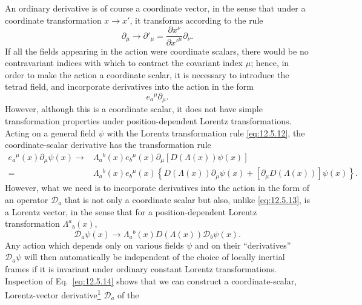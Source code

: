 An ordinary derivative is of course a coordinate vector, in the sense that
under a coordinate transformation \(x\longrightarrow x'\), it transforms
according to the rule
\[
  \partial_\mu
  \longrightarrow
  \partial'_\mu
  =
  \frac{\partial x^\nu}{\partial x'^\mu}\partial_\nu.
\]
If all the fields appearing in the action were coordinate scalars, there
would be no contravariant indices with which to contract the covariant index
\(\mu\); hence, in order to make the action a coordinate scalar, it is
necessary to introduce the tetrad field, and incorporate derivatives into the
action in the form
\begin{equation}
  e_a{}^\mu\partial_\mu.
  \tag{12.5.13}\label{eq:12.5.13}
\end{equation}
However, although this is a coordinate scalar, it does not have simple
transformation properties under position-dependent Lorentz transformations.
Acting on a general field \(\psi\) with the Lorentz transformation rule
\eqref{eq:12.5.12}, the coordinate-scalar derivative has the transformation
rule
\begin{equation}
\begin{aligned}
  e_a{}^\mu(x)\partial_\mu\psi(x)
  \longrightarrow{}&
  \Lambda_a{}^b(x)e_b{}^\mu(x)
  \partial_\mu\!\left[D(\Lambda(x))\psi(x)\right]
  \\
  ={}&
  \Lambda_a{}^b(x)e_b{}^\mu(x)
  \left\{
    D(\Lambda(x))\partial_\mu\psi(x)
    +[\partial_\mu D(\Lambda(x))]\psi(x)
  \right\}.
\end{aligned}
  \tag{12.5.14}\label{eq:12.5.14}
\end{equation}
However, what we need is to incorporate derivatives into the action in the
form of an operator \(\mathcal D_a\) that is not only a coordinate scalar but
also, unlike \eqref{eq:12.5.13}, is a Lorentz vector, in the sense that for a
position-dependent Lorentz transformation \(\Lambda^a{}_b(x)\),
\begin{equation}
  \mathcal D_a\psi(x)
  \longrightarrow
  \Lambda_a{}^b(x)D(\Lambda(x))\mathcal D_b\psi(x).
  \tag{12.5.15}\label{eq:12.5.15}
\end{equation}
Any action which depends only on various fields \(\psi\) and on their
``derivatives'' \(\mathcal D_a\psi\) will then automatically be independent
of the choice of locally inertial frames if it is invariant under ordinary
constant Lorentz transformations. Inspection of Eq.~\eqref{eq:12.5.14}
shows that we can construct a coordinate-scalar, Lorentz-vector
derivative\hyperref[ch12-ref-1]{\textsuperscript{1}} \(\mathcal D_a\) of the

